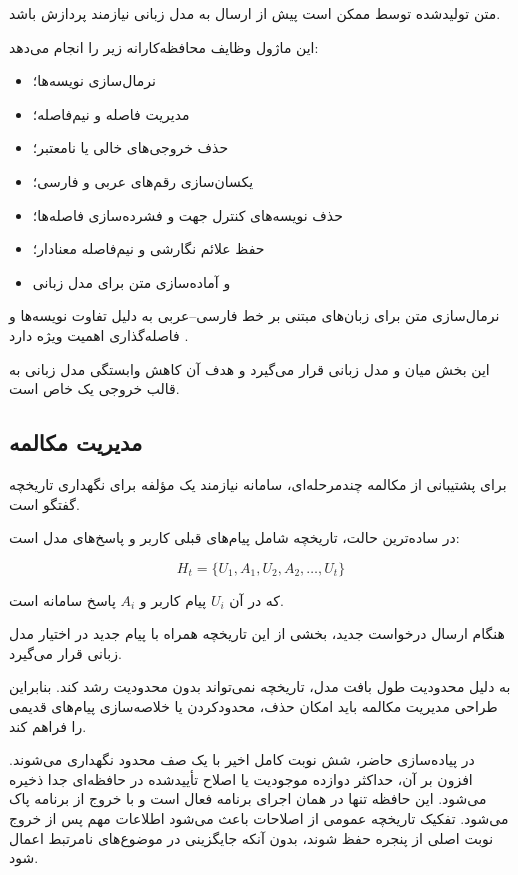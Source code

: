 متن تولیدشده توسط  ممکن است پیش از ارسال به مدل زبانی
نیازمند پردازش باشد.

این ماژول وظایف محافظه‌کارانه زیر را انجام می‌دهد:

\begin{itemize}

    \item نرمال‌سازی نویسه‌ها؛
    \item مدیریت فاصله و نیم‌فاصله؛
    \item حذف خروجی‌های خالی یا نامعتبر؛
    \item یکسان‌سازی رقم‌های عربی و فارسی؛
    \item حذف نویسه‌های کنترل جهت و فشرده‌سازی فاصله‌ها؛
    \item حفظ علائم نگارشی و نیم‌فاصله معنادار؛
    \item و آماده‌سازی متن برای مدل زبانی
\end{itemize}

نرمال‌سازی متن برای زبان‌های مبتنی بر خط
فارسی--عربی به دلیل تفاوت نویسه‌ها و فاصله‌گذاری اهمیت ویژه دارد
\cite{mohtaj2018parsivar}.

این بخش میان  و مدل زبانی قرار می‌گیرد و هدف آن کاهش
وابستگی مدل زبانی به قالب خروجی یک  خاص است.


\subsection{مدیریت مکالمه}

برای پشتیبانی از مکالمه چندمرحله‌ای، سامانه نیازمند یک مؤلفه
برای نگهداری تاریخچه گفتگو است.

در ساده‌ترین حالت، تاریخچه شامل پیام‌های قبلی کاربر و پاسخ‌های
مدل است:

\begin{equation}
H_t =
\{U_1,A_1,U_2,A_2,\ldots,U_t\}
\end{equation}

که در آن $U_i$ پیام کاربر و $A_i$ پاسخ سامانه است.

هنگام ارسال درخواست جدید، بخشی از این تاریخچه همراه با پیام
جدید در اختیار مدل زبانی قرار می‌گیرد.

به دلیل محدودیت طول بافت مدل، تاریخچه نمی‌تواند بدون محدودیت
رشد کند.
بنابراین طراحی مدیریت مکالمه باید امکان حذف، محدودکردن یا
خلاصه‌سازی پیام‌های قدیمی را فراهم کند.

در پیاده‌سازی حاضر، شش نوبت کامل اخیر با یک صف محدود نگهداری
می‌شوند. افزون بر آن، حداکثر دوازده موجودیت یا اصلاح تأییدشده در
حافظه‌ای جدا ذخیره می‌شود. این حافظه تنها در همان اجرای برنامه
فعال است و با خروج از برنامه پاک می‌شود. تفکیک تاریخچه عمومی از
اصلاحات باعث می‌شود اطلاعات مهم پس از خروج نوبت اصلی از پنجره
حفظ شوند، بدون آنکه جایگزینی در موضوع‌های نامرتبط اعمال شود.


